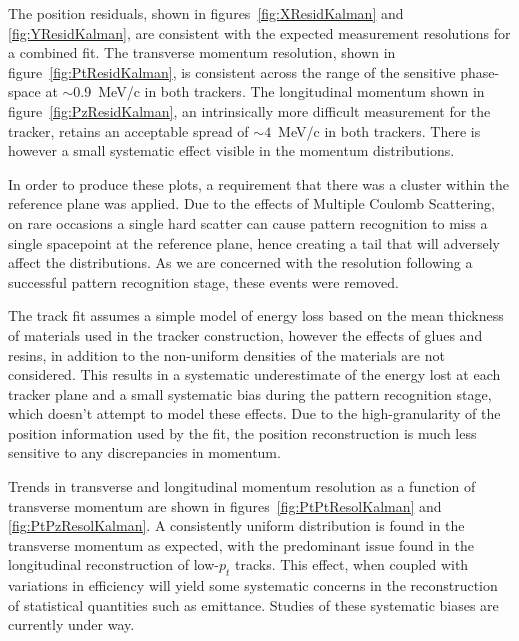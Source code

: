   The position residuals, shown in figures~\ref{fig:XResidKalman} and \ref{fig:YResidKalman}, are consistent with the expected measurement resolutions for a combined fit. The transverse momentum resolution, shown in figure~\ref{fig:PtResidKalman}, is consistent across the range of the sensitive phase-space at $\sim$0.9~MeV/c in both trackers. The longitudinal momentum shown in figure~\ref{fig:PzResidKalman}, an intrinsically more difficult measurement for the tracker, retains an acceptable spread of ${\sim4}$~MeV/c in both trackers. There is however a small systematic effect visible in the momentum distributions.

  In order to produce these plots, a requirement that there was a cluster within the reference plane was applied. Due to the effects of Multiple Coulomb Scattering, on rare occasions a single hard scatter can cause pattern recognition to miss a single spacepoint at the reference plane, hence creating a tail that will adversely affect the distributions. As we are concerned with the resolution following a successful pattern recognition stage, these events were removed.
  
  The track fit assumes a simple model of energy loss based on the mean thickness of materials used in the tracker construction, however the effects of glues and resins, in addition to the non-uniform densities of the materials are not considered. This results in a systematic underestimate of the energy lost at each tracker plane and a small systematic bias during the pattern recognition stage, which doesn't attempt to model these effects. Due to the high-granularity of the position information used by the fit, the position reconstruction is much less sensitive to any discrepancies in momentum. %
 
  Trends in transverse and longitudinal momentum resolution as a function of transverse momentum are shown in figures~\ref{fig:PtPtResolKalman} and \ref{fig:PtPzResolKalman}. A consistently uniform distribution is found in the transverse momentum as expected, with the predominant issue found in the longitudinal reconstruction of low-$p_t$ tracks. This effect, when coupled with variations in efficiency will yield some systematic concerns in the reconstruction of statistical quantities such as emittance. Studies of these systematic biases are currently under way.

